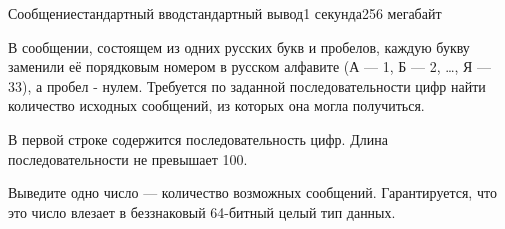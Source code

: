 \begin{problem}{Сообщение}{стандартный ввод}{стандартный вывод}{1 секунда}{256 мегабайт}

В сообщении, состоящем из одних русских букв и пробелов, каждую букву заменили
её порядковым номером в русском алфавите (А --- 1, Б --- 2, \ldots, Я --- 33), а пробел
- нулем. Требуется по заданной последовательности цифр найти количество
исходных сообщений, из которых она могла получиться.


\InputFile
В первой строке содержится последовательность цифр. Длина последовательности не превышает 100.

\OutputFile
Выведите одно число --- количество возможных сообщений. Гарантируется, что это число влезает в беззнаковый 64-битный целый тип данных.

\Example

\begin{example}
%
\end{example}

\end{problem}

